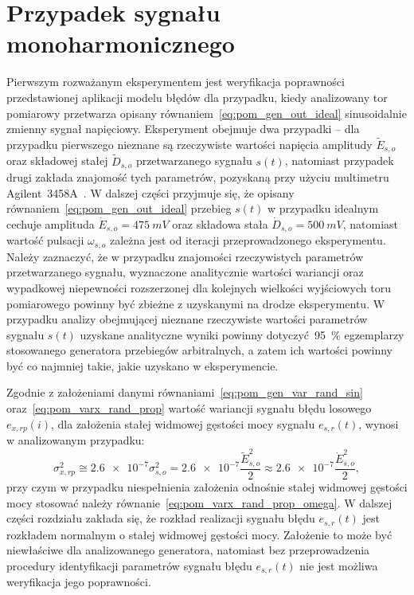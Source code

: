 \section{Przypadek sygnału monoharmonicznego}

Pierwszym rozważanym eksperymentem jest weryfikacja poprawności przedstawionej aplikacji modelu błędów dla przypadku, kiedy analizowany tor pomiarowy przetwarza opisany równaniem~\eqref{eq:pom_gen_out_ideal} sinusoidalnie zmienny sygnał napięciowy. Eksperyment obejmuje dwa przypadki -- dla przypadku pierwszego nieznane są rzeczywiste wartości napięcia amplitudy $\tilde{E}_{s,o}$ oraz składowej stałej $\tilde{D}_{s,o}$ przetwarzanego sygnału $s(t)$, natomiast przypadek drugi zakłada znajomość tych parametrów, pozyskaną przy użyciu multimetru Agilent~3458A~\cite{agilent_manual}. W dalszej części przyjmuje się, że opisany równaniem~\eqref{eq:pom_gen_out_ideal} przebieg $s(t)$ w przypadku idealnym cechuje amplituda $\dot{E}_{s,o} = \qty{475}{mV}$ oraz składowa stała $\dot{D}_{s,o} = \qty{500}{mV}$, natomiast wartość pulsacji $\omega_{s,o}$ zależna jest od iteracji przeprowadzonego eksperymentu.
Należy zaznaczyć, że w przypadku znajomości rzeczywistych parametrów przetwarzanego sygnału, wyznaczone analitycznie wartości wariancji oraz wypadkowej niepewności rozszerzonej dla kolejnych wielkości wyjściowych toru pomiarowego powinny być zbieżne z uzyskanymi na drodze eksperymentu. W przypadku analizy obejmującej nieznane rzeczywiste wartości parametrów sygnału $s(t)$ uzyskane analityczne wyniki powinny dotyczyć~\qty{95}{\percent} egzemplarzy stosowanego generatora przebiegów arbitralnych, a zatem ich wartości powinny być co najmniej takie, jakie uzyskano w eksperymencie.

Zgodnie z założeniami danymi równaniami~\eqref{eq:pom_gen_var_rand_sin} oraz~\eqref{eq:pom_varx_rand_prop} wartość wariancji sygnału błędu losowego $e_{x,rp}(i)$, dla założenia stałej widmowej gęstości mocy sygnału $e_{s,r}(t)$, wynosi w analizowanym przypadku:
\begin{equation}
\sigma_{x,rp}^{2} \cong \num{2.6e-7} \sigma_{s,o}^{2} = \num{2.6e-7} \frac{\tilde{E}_{s,o}^{2}}{2} \approx \num{2.6e-7} \frac{\dot{E}_{s,o}^{2}}{2} \label{eq:pom_mono_rand_var_in},
\end{equation}
przy czym w przypadku niespełnienia założenia odnośnie stałej widmowej gęstości mocy stosować należy równanie~\eqref{eq:pom_varx_rand_prop_omega}. W dalszej części rozdziału zakłada się, że rozkład realizacji sygnału błędu $e_{s,r}(t)$ jest rozkładem normalnym o stałej widmowej gęstości mocy. Założenie to może być niewłaściwe dla analizowanego generatora, natomiast bez przeprowadzenia procedury identyfikacji parametrów sygnału błędu $e_{s,r}(t)$ nie jest możliwa weryfikacja jego poprawności.

